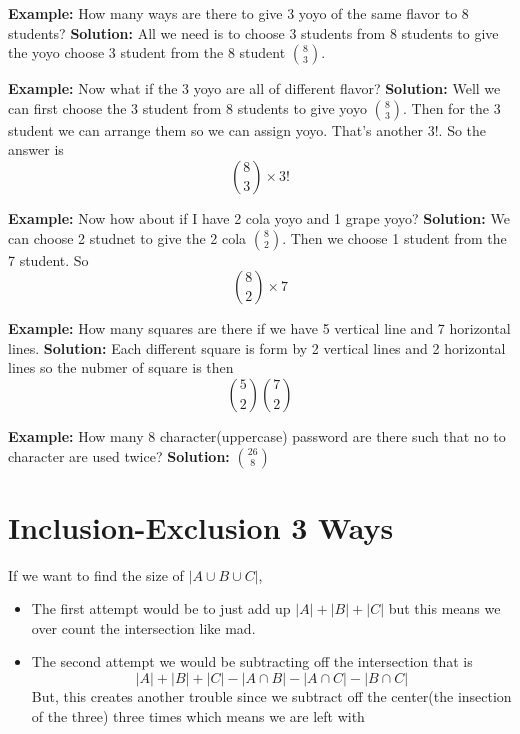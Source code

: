 \documentclass[a4paper, 12pt]{article}
\newcommand{\example}{\vspace{1em}\noindent\textbf{Example:} }
\newcommand{\solution}{\newline\noindent\textbf{Solution:} }
\begin{document}
\begin{multicols}{2}
	\example How many ways are there to give 3 yoyo of the same flavor to 8 students?
	\solution All we need is to choose 3 students from 8 students to give the yoyo choose 3 student from the 8 student $\displaystyle {8 \choose 3}$.
	
	\example Now what if the 3 yoyo are all of different flavor?
	\solution Well we can first choose the 3 student from 8 students to give yoyo $\displaystyle {8 \choose 3}$. Then for the 3 student we can arrange them so we can assign yoyo. That's another $3!$. So the answer is\[
		{8 \choose 3} \times 3!
	\]
	
	\example Now how about if I have 2 cola yoyo and 1 grape yoyo?
	\solution We can choose 2 studnet to give the 2 cola $\displaystyle {8 \choose 2}$. Then we choose 1 student from the 7 student. So\[
		{8 \choose 2} \times 7
	\]
	
	
	\example How many squares are there if we have 5 vertical line and 7 horizontal lines.
	\solution Each different square is form by 2 vertical lines and 2  horizontal lines so the nubmer of square is then\[
		{5 \choose 2}{7 \choose 2}
	\]
	
	\example How many 8 character(uppercase) password are there such that no to character are used twice?
	\solution $\displaystyle {26 \choose 8}$
	
	\section*{Inclusion-Exclusion 3 Ways}
	
	If we want to find the size of $|A \cup B \cup C|$,
	\begin{itemize}
		\item The first attempt would be to just add up $|A|+|B|+|C|$ but this means we over count the intersection like mad.
\begin{center}
\end{center}
		\item The second attempt we would be subtracting off the intersection that is
		\[
		 |A|+|B|+|C| - |A \cap B| - |A \cap C| - | B \cap C|
		 \]
		 But, this creates another trouble since we subtract off the center(the insection of the three) three times which means we are left with
\begin{center}
\end{center}
\end{itemize}
\end{multicols}
\end{document}
